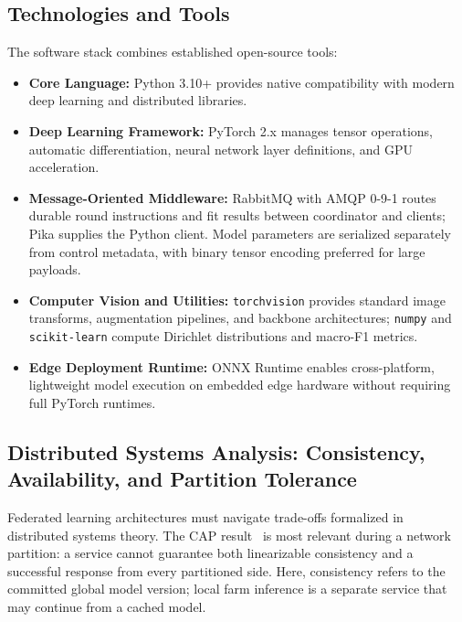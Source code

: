 \documentclass[applsci,article,submit,oneauthor,pdftex]{Definitions/mdpi}
\begin{document}
\subsection{Technologies and Tools}
The software stack combines established open-source tools:
\begin{itemize}[leftmargin=*]
    \item \textbf{Core Language:} Python 3.10+ provides native compatibility with modern deep learning and distributed libraries.
    \item \textbf{Deep Learning Framework:} PyTorch 2.x manages tensor operations, automatic differentiation, neural network layer definitions, and GPU acceleration.
    \item \textbf{Message-Oriented Middleware:} RabbitMQ with AMQP 0-9-1 routes durable round instructions and fit results between coordinator and clients; Pika supplies the Python client. Model parameters are serialized separately from control metadata, with binary tensor encoding preferred for large payloads.
    \item \textbf{Computer Vision and Utilities:} \texttt{torchvision} provides standard image transforms, augmentation pipelines, and backbone architectures; \texttt{numpy} and \texttt{scikit-learn} compute Dirichlet distributions and macro-F1 metrics.
    \item \textbf{Edge Deployment Runtime:} ONNX Runtime enables cross-platform, lightweight model execution on embedded edge hardware without requiring full PyTorch runtimes.
\end{itemize}

\subsection{Distributed Systems Analysis: Consistency, Availability, and Partition Tolerance}

Federated learning architectures must navigate trade-offs formalized in distributed systems theory. The CAP result~\cite{brewer2000cap} is most relevant during a network partition: a service cannot guarantee both linearizable consistency and a successful response from every partitioned side. Here, consistency refers to the committed global model version; local farm inference is a separate service that may continue from a cached model.
\end{document}

